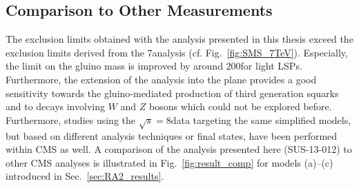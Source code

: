 \subsection{Comparison to Other Measurements}
\label{subsec:RA2_comp}
The exclusion limits obtained with the analysis presented in this thesis exceed the exclusion limits derived from the 7\tev analysis (cf. Fig.~\ref{fig:SMS_7TeV}). Especially, the limit on the gluino mass is improved by around 200\gev for light LSPs. Furthermore, the extension of the analysis into the \NJets plane provides a good sensitivity towards the gluino-mediated production of third generation squarks and to decays involving $W$ and $Z$ bosons which could not be explored before. \\
Furthermore, studies using the $\sqrt{s} = 8$\tev data targeting the same simplified models, but based on different analysis techniques or final states, have been performed within CMS as well. A comparison of the analysis presented here (SUS-13-012) to other CMS analyses is illustrated in Fig.~\ref{fig:result_comp} for models (a)--(c) introduced in Sec.~\ref{sec:RA2_results}. 
